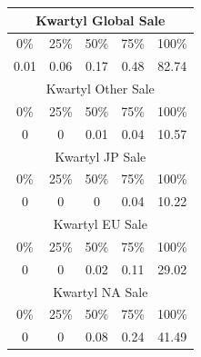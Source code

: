 \documentclass[12pt]{article}
\begin{document}
\begin{table}[h]
\begin{tabular}{|ccccc|}
			\multicolumn{5}{|c|}{Kwartyl Global Sale}                                                                                                      \\ \hline
			\multicolumn{1}{|c|}{0\%}                          & \multicolumn{1}{c|}{25\%} & \multicolumn{1}{c|}{50\%} & \multicolumn{1}{c|}{75\%} & 100\% \\ \hline
			\multicolumn{1}{|c|}{\cellcolor[HTML]{FFFFFF}0.01} & \multicolumn{1}{c|}{0.06} & \multicolumn{1}{c|}{0.17} & \multicolumn{1}{c|}{0.48} & 82.74 \\ \hline
		\multicolumn{5}{|c|}{Kwartyl Other Sale}                                                                                                      \\ \hline
		\multicolumn{1}{|c|}{0\%}                          & \multicolumn{1}{c|}{25\%} & \multicolumn{1}{c|}{50\%} & \multicolumn{1}{c|}{75\%} & 100\% \\ \hline
		\multicolumn{1}{|c|}{\cellcolor[HTML]{FFFFFF}0} & \multicolumn{1}{c|}{0} & \multicolumn{1}{c|}{0.01} & \multicolumn{1}{c|}{0.04} & 10.57 \\ \hline
		\multicolumn{5}{|c|}{Kwartyl JP Sale}                                                                                                      \\ \hline
		\multicolumn{1}{|c|}{0\%}                          & \multicolumn{1}{c|}{25\%} & \multicolumn{1}{c|}{50\%} & \multicolumn{1}{c|}{75\%} & 100\% \\ \hline
		\multicolumn{1}{|c|}{\cellcolor[HTML]{FFFFFF}0} & \multicolumn{1}{c|}{0} & \multicolumn{1}{c|}{0} & \multicolumn{1}{c|}{0.04} & 10.22 \\ \hline		
		\multicolumn{5}{|c|}{Kwartyl EU Sale}                                                                                                      \\ \hline
		\multicolumn{1}{|c|}{0\%}                          & \multicolumn{1}{c|}{25\%} & \multicolumn{1}{c|}{50\%} & \multicolumn{1}{c|}{75\%} & 100\% \\ \hline
		\multicolumn{1}{|c|}{\cellcolor[HTML]{FFFFFF}0} & \multicolumn{1}{c|}{0} & \multicolumn{1}{c|}{0.02} & \multicolumn{1}{c|}{0.11} & 29.02 \\ \hline
		\multicolumn{5}{|c|}{Kwartyl NA Sale}                                                                                                      \\ \hline
		\multicolumn{1}{|c|}{0\%}                          & \multicolumn{1}{c|}{25\%} & \multicolumn{1}{c|}{50\%} & \multicolumn{1}{c|}{75\%} & 100\% \\ \hline
		\multicolumn{1}{|c|}{\cellcolor[HTML]{FFFFFF}0} & \multicolumn{1}{c|}{0} & \multicolumn{1}{c|}{0.08} & \multicolumn{1}{c|}{0.24} & 41.49 \\ \hline
\end{tabular}
	\end{table}
\end{document}
